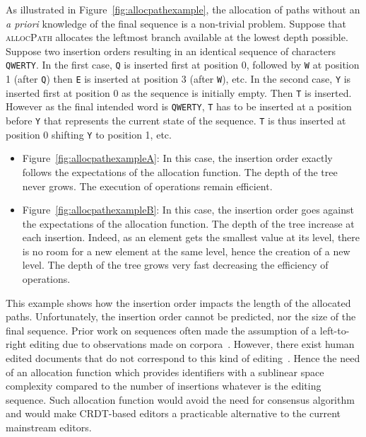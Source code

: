 As illustrated in Figure~\ref{fig:allocpathexample}, the allocation of paths
without an \emph{a priori} knowledge of the final sequence is a non-trivial
problem.  Suppose that \textsc{allocPath} allocates the leftmost branch
available at the lowest depth possible. Suppose two insertion orders resulting
in an identical sequence of characters \texttt{QWERTY}.  In the first case,
\texttt{Q} is inserted first at position 0, followed by \texttt{W} at position 1
(after \texttt{Q}) then \texttt{E} is inserted at position 3 (after \texttt{W}),
etc.  In the second case, \texttt{Y} is inserted first at position 0 as the
sequence is initially empty. Then \texttt{T} is inserted. However as the final
intended word is \texttt{QWERTY}, \texttt{T} has to be inserted at a position
before \texttt{Y} that represents the current state of the sequence. \texttt{T}
is thus inserted at position 0 shifting \texttt{Y} to position 1, etc.


\begin{itemize}[noitemsep, leftmargin=*]
\item Figure~\ref{fig:allocpathexampleA}: In this case, the insertion order
  exactly follows the expectations of the allocation function. The depth of the
  tree never grows. The execution of operations remain efficient.

\item Figure~\ref{fig:allocpathexampleB}: In this case, the insertion order goes
  against the expectations of the allocation function. The depth of the tree
  increase at each insertion. Indeed, as an element gets the smallest value at
  its level, there is no room for a new element at the same level, hence the
  creation of a new level. The depth of the tree grows very fast decreasing the
  efficiency of operations.
\end{itemize}

This example shows how the insertion order impacts the length of the allocated
paths. Unfortunately, the insertion order cannot be predicted, nor the size of
the final sequence. Prior work on sequences often made the assumption of a
left-to-right editing due to observations made on
corpora~\cite{preguica2009commutative, weiss2009logoot}. However, there exist
human edited documents that do not correspond to this kind of
editing~\cite{nedelec2013lseq}.
Hence the need of an allocation function which provides identifiers with a
sublinear space complexity compared to the number of insertions whatever is the
editing sequence. Such allocation function would avoid the need for consensus
algorithm~\cite{mostefaoui2015signature} and would make CRDT-based editors a
practicable alternative to the current mainstream editors.
 
